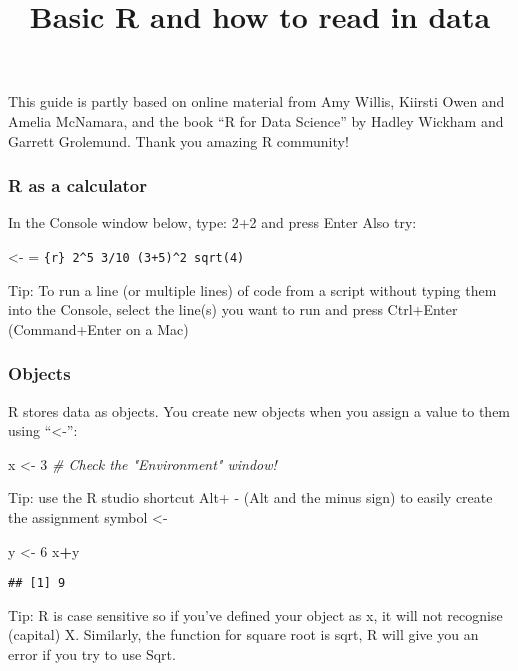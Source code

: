 \documentclass[
]{article}
\title{Basic R and how to read in data}
\author{}
\date{\vspace{-2.5em}}
\newenvironment{Shaded}{\begin{snugshade}}{\end{snugshade}}
\newcommand{\CommentTok}[1]{\textcolor[rgb]{0.56,0.35,0.01}{\textit{#1}}}
\newcommand{\DecValTok}[1]{\textcolor[rgb]{0.00,0.00,0.81}{#1}}
\newcommand{\NormalTok}[1]{#1}
\newcommand{\OtherTok}[1]{\textcolor[rgb]{0.56,0.35,0.01}{#1}}
\newcommand{\SpecialCharTok}[1]{\textcolor[rgb]{0.81,0.36,0.00}{\textbf{#1}}}
\begin{document}
\maketitle

This guide is partly based on online material from Amy Willis, Kiirsti
Owen and Amelia McNamara, and the book ``R for Data Science'' by Hadley
Wickham and Garrett Grolemund. Thank you amazing R community!

\subsubsection{R as a calculator}\label{r-as-a-calculator}

In the Console window below, type: 2+2 and press Enter Also try:

\textless- = \texttt{\{r\}\ 2\^{}5\ 3/10\ (3+5)\^{}2\ sqrt(4)}

Tip: To run a line (or multiple lines) of code from a script without
typing them into the Console, select the line(s) you want to run and
press Ctrl+Enter (Command+Enter on a Mac)

\subsubsection{Objects}\label{objects}

R stores data as objects. You create new objects when you assign a value
to them using ``\textless-'':

\begin{Shaded}
\begin{Highlighting}[]
\NormalTok{x }\OtherTok{\textless{}{-}} \DecValTok{3}  \CommentTok{\# Check the "Environment" window!}
\end{Highlighting}
\end{Shaded}

Tip: use the R studio shortcut Alt+ - (Alt and the minus sign) to easily
create the assignment symbol \textless-

\begin{Shaded}
\begin{Highlighting}[]
\NormalTok{y }\OtherTok{\textless{}{-}} \DecValTok{6}
\NormalTok{x}\SpecialCharTok{+}\NormalTok{y}
\end{Highlighting}
\end{Shaded}

\begin{verbatim}
## [1] 9
\end{verbatim}

Tip: R is case sensitive so if you've defined your object as x, it will
not recognise (capital) X. Similarly, the function for square root is
sqrt, R will give you an error if you try to use Sqrt.
\end{document}
